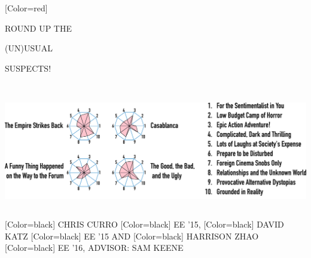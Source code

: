 \documentclass{article}
\begin{document}
\begin{minipage}[c]{28in}
{ 
[Color=red]
\fontsize{3.5in}{0.5in}\selectfont 
\bfseries





ROUND UP THE

\vspace{0.5in}

{ (UN)}USUAL 

\vspace{0.5in}

SUSPECTS!

}
\end{minipage}
\vspace{1in}\\
\colorbox{white}{
\begin{minipage}{28in}
\centering
\includegraphics[width=27in]{figure.pdf}
\end{minipage}
}
\vspace{1in}\\
{
[Color=black]
\fontsize{1in}{1em}\selectfont 
CHRIS CURRO
}
{
[Color=black]
\fontsize{0.8in}{1em}\selectfont 
EE '15,
}
{
[Color=black]
\fontsize{1in}{1em}\selectfont 
DAVID KATZ
}
{
[Color=black]
\fontsize{0.8in}{1em}\selectfont 
EE '15 AND
}
{
[Color=black]
\fontsize{1in}{1em}\selectfont 
HARRISON ZHAO
}
{
[Color=black]
\fontsize{0.8in}{1em}\selectfont 
EE '16, ADVISOR: SAM KEENE
}
\vspace{0.8in}\\
\end{document}
